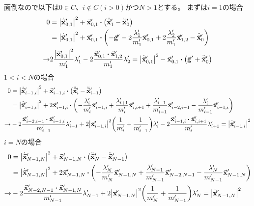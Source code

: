 \documentclass[uplatex]{jsarticle}
\begin{document}
面倒なので以下は$0 \in C$、$i \notin C (i > 0)$かつ$N > 1$とする。
まずは$i=1$の場合
\begin{align}
    0 &= \abs{\dot{\va{x}}_{0,1}^\prime}^2 + \va{x}_{0,1}^\prime
        \vdot \qty(\ddot{\va{x}}_1^\prime - \ddot{\va{x}}_0^\prime) \nonumber \\
    &= \abs{\dot{\va{x}}_{0,1}^\prime}^2 + \va{x}_{0,1}^\prime
        \vdot \qty(
            -\va{g}^\prime - 2\frac{\lambda_1^\prime}{m_1^\prime} \va{x}_{0,1}^\prime
            + 2\frac{\lambda_2^\prime}{m_1^\prime}\va{x}_{1,2}^\prime - \ddot{\va{x}}_0^\prime) \nonumber \\
    \rightarrow &
    2\frac{\abs{\va{x}_{0,1}^\prime}^2}{m_1^\prime} \lambda_1^\prime
    -2\frac{\va{x}_{0,1}^\prime \vdot \va{x}_{1,2}^\prime}{m_1^\prime} \lambda_2^\prime
        = \abs{\dot{\va{x}}_{0,1}^\prime}^2 - \va{x}_{0,1}^\prime \vdot \qty(\va{g}^\prime + \ddot{\va{x}}_0^\prime)
\end{align}
$1<i<N$の場合
\begin{align}
    0 &= \abs{\dot{\va{x}}_{i-1,i}^\prime}^2 + \va{x}_{i-1,i}^\prime
        \vdot \qty(\ddot{\va{x}}_i^\prime - \ddot{\va{x}}_{i-1}^\prime) \nonumber \\
    &= \abs{\dot{\va{x}}_{i-1,i}^\prime}^2 + 2\va{x}_{i-1,i}^\prime \vdot \qty(
        -\frac{\lambda_i^\prime}{m_i^\prime} \va{x}_{i-1,i}^\prime
        +\frac{\lambda_{i+1}^\prime}{m_i^\prime} \va{x}_{i,i+1}^\prime
        +\frac{\lambda_{i-1}^\prime}{m_{i-1}^\prime} \va{x}_{i-2,i-1}^\prime
        -\frac{\lambda_i^\prime}{m_{i-1}^\prime} \va{x}_{i-1,i}^\prime
    ) \nonumber \\
    \rightarrow &
    -2\frac{\va{x}_{i-2,i-1}^\prime \vdot \va{x}_{i-1,i}^\prime}{m_{i-1}^\prime} \lambda_{i-1}^\prime
    +2\abs{\va{x}_{i-1,i}^\prime}^2 \qty(\frac{1}{m_i^\prime} + \frac{1}{m_{i-1}^\prime}) \lambda_i^\prime
    -2\frac{\va{x}_{i-1,i}^\prime \vdot \va{x}_{i,i+1}^\prime}{m_i^\prime} \lambda_{i+1}^\prime
    = \abs{\dot{\va{x}}_{i-1,i}^\prime}^2
\end{align}
$i=N$の場合
\begin{align}
    0 &= \abs{\dot{\va{x}}_{N-1,N}^\prime}^2 + \va{x}_{N-1,N}^\prime
        \vdot \qty(\ddot{\va{x}}_N^\prime - \ddot{\va{x}}_{N-1}^\prime) \nonumber \\
    &= \abs{\dot{\va{x}}_{N-1,N}^\prime}^2 + 2\va{x}_{N-1,N}^\prime \vdot \qty(
        -\frac{\lambda_N^\prime}{m_N^\prime} \va{x}_{N-1,N}^\prime
        +\frac{\lambda_{N-1}^\prime}{m_{N-1}^\prime} \va{x}_{N-2,N-1}^\prime
        -\frac{\lambda_N^\prime}{m_{N-1}^\prime} \va{x}_{N-1,N}^\prime
    ) \nonumber \\
    \rightarrow &
    -2\frac{\va{x}_{N-2,N-1}^\prime \vdot \va{x}_{N-1,N}^\prime}{m_{N-1}^\prime} \lambda_{N-1}^\prime
    +2\abs{\va{x}_{N-1,N}^\prime}^2 \qty(\frac{1}{m_N^\prime} + \frac{1}{m_{N-1}^\prime}) \lambda_N^\prime
    = \abs{\dot{\va{x}}_{N-1,N}^\prime}^2
\end{align}
\end{document}
